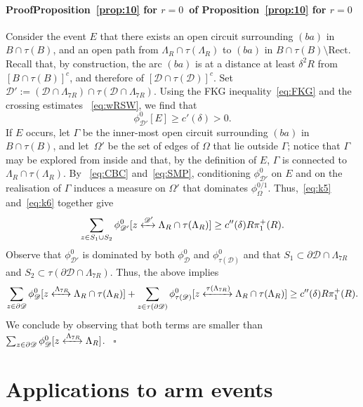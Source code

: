 \documentclass[a4paper,oneside,11pt]{article}
\numberwithin{equation}{section}
\numberwithin{equation}{section}
\numberwithin{equation}{section}
\newenvironment{proof}[1][\relax]%
  {\paragraph{Proof\ifx#1\relax\else~of #1\fi}}%
  {~\hfill$\square$\par\bigskip}
\newcommand{\calD}{\mathcal{D}}
\newcommand{\La}{\Lambda}
\begin{document}
\begin{proof}[Proposition~\ref{prop:10} for $r=0$]
Consider the event $E$ that there exists an open circuit surrounding $(ba)$ in $B\cap\tau (B)$, 
and an open path from $\Lambda_{R}\cap \tau(\Lambda_{R})$ to $(ba)$ in $B\cap\tau (B)\setminus \mathrm{Rect}$. 
Recall that, by construction, the arc $(ba)$ is at a distance at least $\delta^2 R$ from $[B\cap\tau (B)]^c$, and therefore of $[\calD\cap\tau(\calD)]^c$. Set $\calD':=(\calD\cap \Lambda_{7R})\cap\tau(\calD\cap \Lambda_{7R})$.
Using the FKG inequality~\eqref{eq:FKG} and the crossing estimates ~\eqref{eq:wRSW}, we find that
\begin{equation}\label{eq:k6}
	\phi_{\calD'}^0[E]\ge c'(\delta)>0.
\end{equation}
If $E$ occurs, let $\Gamma$ be the inner-most open circuit surrounding $(ba)$ in $B\cap\tau (B)$,
and let~$\Omega'$ be the set of edges of $\Omega$ that lie outside $\Gamma$; notice that $\Gamma$ may be explored from inside and that, by the definition of $E$, $\Gamma$ is connected to $\Lambda_{R}\cap \tau(\Lambda_{R})$.
By ~\eqref{eq:CBC} and~\eqref{eq:SMP}, conditioning $\phi_{\calD'}^0$ on $E$ and on the realisation of $\Gamma$ induces
a measure on $\Omega'$ that dominates $\phi^{0/1}_\Omega$. Thus,~\eqref{eq:k5} and~\eqref{eq:k6} together give
\begin{equation*}
	\sum_{z\in  S_1 \cup S_2} \phi^{0}_{\calD'}[z \xleftrightarrow{\calD'} \Lambda_R\cap \tau(\Lambda_R)] 
	\ge c''(\delta) R\pi_1^+(R).
\end{equation*}
Observe that $\phi^{0}_{\calD'}$ is dominated by both $\phi^{0}_{\calD}$ and $\phi^{0}_{\tau(\calD)}$
and that $S_1 \subset \partial \calD \cap \La_{7R}$ and $S_2 \subset \tau(\partial \calD \cap \La_{7R})$.
Thus, the above implies 
\begin{equation*}
	\sum_{z\in  \partial \calD} \phi^{0}_{\calD}[z \xleftrightarrow{\Lambda_{7R}}   \Lambda_R\cap\tau(\Lambda_R)] 
	+ 	\sum_{z\in  \tau(\partial \calD)} \phi^{0}_{\tau(\calD)}[z \xleftrightarrow{\tau(\Lambda_{7R})}   \Lambda_R\cap \tau(\Lambda_R)]
	\ge c''(\delta)R\pi_1^+(R).
\end{equation*}
We conclude by observing that both terms are smaller than $\sum_{z\in  \partial \calD } \phi^{0}_{\calD}[z \xleftrightarrow{\Lambda_{7R}}\Lambda_R]$.
\end{proof}


\section{Applications to arm events}\label{sec:4}
\end{document}
